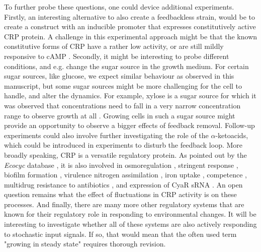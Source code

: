 To further probe these questions, one could device additional experiments.
%
Firstly, an interesting alternative to also create a feedbackless strain, would be to
create a construct with an inducible promoter that expresses 
constitutively active CRP protein. %
A challenge in this experimental approach might be that the known constitutive forms of CRP have a rather low activity, or are still mildly responsive to cAMP \cite{Aiba1985, Garges1985}.
%
Secondly, it might be interesting to probe different conditions, and e.g. change the sugar source in the growth medium.
For certain sugar sources, like glucose, we expect similar behaviour as observed in this manuscript, 
but some sugar sources might be more challenging for the cell to handle, and alter the dynamics.
% 
For example, xylose is a sugar source for which it was observed that concentrations need to fall in a very narrow concentration range to observe growth at all \cite{Towbin2017personalcomm}. 
%
Growing cells in such a sugar source might provide an opportunity to observe a bigger effects of feedback removal. %
%
Follow-up experiments could also involve further investigating the role of the $\alpha$-ketoacids, 
which could be introduced in experiments to disturb the feedback loop.
%
More broadly speaking, 
CRP is a versatile regulatory protein.%
%
As pointed out by the \textit{Ecocyc} database \cite{Keseler2017}, it is also involved in 
osmoregulation \cite{Landis1999},
stringent response \cite{Johansson2000}, 
biofilm formation \cite{Jackson2002}, 
virulence \cite{Baga1985} %
nitrogen assimilation \cite{Mao2007, Paul2007}, 
iron uptake \cite{Zhang2005}, 
competence \cite{Sinha2009}, 
multidrug resistance to antibiotics \cite{Hirakawa2006a}, 
and expression of CyaR sRNA \cite{DeLay2009a}.
%
An open question remains what the effect of fluctuations in CRP activity is on these processes.
%
%
And finally,
there are many more other 
regulatory systems 
that are known for their regulatory role in responding to environmental changes.
It will be interesting to
investigate whether all of these systems are also actively responding to stochastic input signals.
%
If so, 
that would mean that the often used term "growing in steady state" requires thorough revision.


